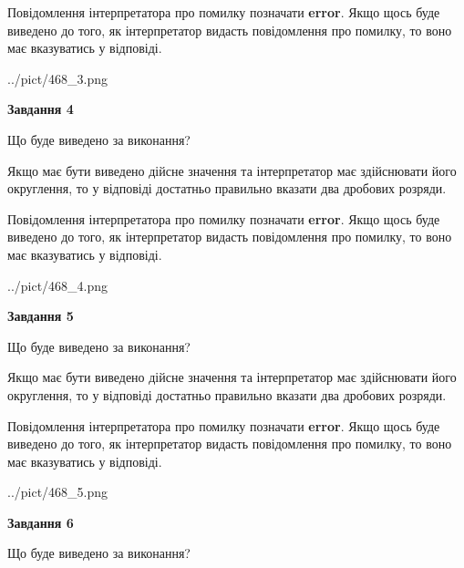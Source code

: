 \documentclass[12pt, ukrainian]{article}
\begin{document}
{\begin {Large}
Повідомлення інтерпретатора про помилку позначати \textbf{error}.
Якщо щось буде виведено до того, як інтерпретатор видасть повідомлення про помилку, 
то воно має вказуватись у відповіді. \par

\begin{center}
	{../pict/468_3.png}
\end{center}
\newpage

{\begin {center}\textbf{Завдання 4}\end {center}}\par
Що буде виведено за виконання? \par

Якщо має бути виведено дійсне значення та інтерпретатор має здійснювати його округлення, 
то у відповіді достатньо правильно вказати два дробових розряди.

Повідомлення інтерпретатора про помилку позначати \textbf{error}.
Якщо щось буде виведено до того, як інтерпретатор видасть повідомлення про помилку, 
то воно має вказуватись у відповіді. \par

\begin{center}
	{../pict/468_4.png}
\end{center}
\newpage

{\begin {center}\textbf{Завдання 5}\end {center}}\par
Що буде виведено за виконання? \par

Якщо має бути виведено дійсне значення та інтерпретатор має здійснювати його округлення, 
то у відповіді достатньо правильно вказати два дробових розряди.

Повідомлення інтерпретатора про помилку позначати \textbf{error}.
Якщо щось буде виведено до того, як інтерпретатор видасть повідомлення про помилку, 
то воно має вказуватись у відповіді. \par

\begin{center}
	{../pict/468_5.png}
\end{center}
\newpage

{\begin {center}\textbf{Завдання 6}\end {center}}\par
Що буде виведено за виконання? \par


\end{Large}}
\end{document}
